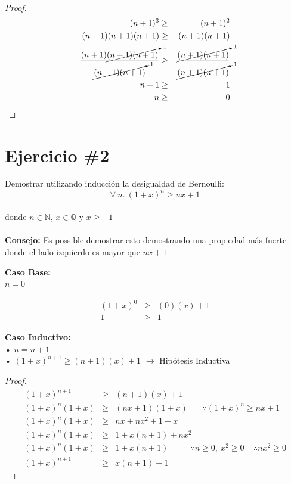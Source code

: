 \documentclass[11pt,letterpaper]{article}
\begin{document}
\begin{proof}

\begin{eqnarray*}
(n+1)^3&\geq&(n+1)^2\\
(n+1)(n+1)(n+1)&\geq&(n+1)(n+1)\\
\frac{(n+1)\cancelto{1}{(n+1)(n+1)}}{\cancelto{1}{(n+1)(n+1)}}&\geq&\frac{\cancelto{1}{(n+1)(n+1)}}{\cancelto{1}{(n+1)(n+1)}} \\
n+1&\geq& 1\\
n&\geq& 0
\end{eqnarray*}

\end{proof}


\section*{\Large Ejercicio \#2}
\noindent Demostrar utilizando inducción la desigualdad de Bernoulli:
\[
        \forall\ n.\ (1+x)^n\geq nx+1
\]
\\donde $n\in \mathbb{N}$, $x\in \mathbb{Q}$ y $x\geq -1$
\\
\\{\bf Consejo: }Es possible demostrar esto demostrando una propiedad más fuerte
donde el lado izquierdo es mayor que $nx + 1$ \vspace{1cm}

\noindent \textbf{\large Caso Base:}\\
\noindent $n=0$

\begin{eqnarray*}
(1+x)^0 &\geq& (0)(x)+1 \\
1 &\geq& 1
\end{eqnarray*}

\vspace{0.1cm}

\noindent \textbf{\large Caso Inductivo:}\\
\noindent • $n=n+1$ \\
\noindent • $(1+x)^{n+1}\geq (n+1)(x)+1$ $\rightarrow$ Hipótesis Inductiva \\

\begin{proof}

\begin{eqnarray*}
(1+x)^{n+1}&\geq&(n+1)(x)+1 \\
(1+x)^n(1+x)&\geq&(nx+1)(1+x) \ \ \ \ \ \ \ \ \because(1+x)^n \geq nx+1 \\ 
(1+x)^n(1+x)&\geq& nx+nx^2+1+x \\
(1+x)^n(1+x)&\geq& 1+x(n+1)+nx^2 \\
(1+x)^n(1+x)&\geq& 1+x(n+1) \ \ \ \ \ \ \ \ \ \ \ \ \because n \geq 0, \ x^2 \geq 0 \ \ \ \ \ \therefore nx^2 \geq 0 \\
(1+x)^{n+1}&\geq& x(n+1)+1
\end{eqnarray*}

\end{proof}
\end{document}
